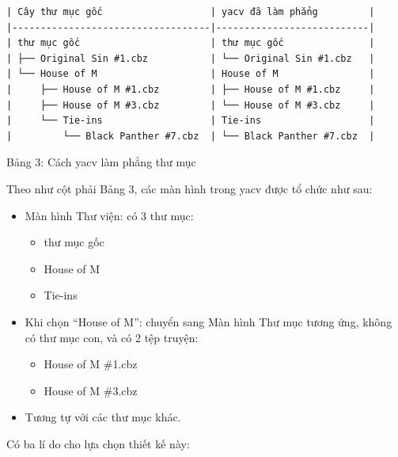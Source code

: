 \begin{verbatim}
| Cây thư mục gốc                   | yacv đã làm phẳng         |
|-----------------------------------|---------------------------|
| thư mục gốc                       | thư mục gốc               |
| ├── Original Sin #1.cbz           | └── Original Sin #1.cbz   |
| └── House of M                    | House of M                |
|     ├── House of M #1.cbz         | ├── House of M #1.cbz     |
|     ├── House of M #3.cbz         | └── House of M #3.cbz     |
|     └── Tie-ins                   | Tie-ins                   |
|         └── Black Panther #7.cbz  | └── Black Panther #7.cbz  |
\end{verbatim}

Bảng 3: Cách yacv làm phẳng thư mục

Theo như cột phải Bảng 3, các màn hình trong yacv được tổ chức như sau:

\begin{itemize}
  \item
        Màn hình Thư viện: có 3 thư mục:

        \begin{itemize}
          
          \item
                thư mục gốc
          \item
                House of M
          \item
                Tie-ins
        \end{itemize}
  \item
        Khi chọn ``House of M'': chuyển sang Màn hình Thư mục tương ứng, không
        có thư mục con, và có 2 tệp truyện:

        \begin{itemize}
          
          \item
                House of M \#1.cbz
          \item
                House of M \#3.cbz
        \end{itemize}
  \item
        Tương tự với các thư mục khác.
\end{itemize}

Có ba lí do cho lựa chọn thiết kế này:

